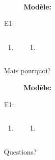 \documentclass{beamer}
\begin{document}
  \begin{frame}{}
     \\
    \tinygloss{}
    \begin{description}
      \item[] \textbf{Modèle:} \emph{}
      \item[E1:]
    \end{description}
    \begin{columns}
        \begin{enumerate}
          \item
        \end{enumerate}
        \begin{enumerate}
          \setcounter{enumi}{}
          \item
        \end{enumerate}
    \end{columns}
  \end{frame}

  \begin{frame}{Mais pourquoi?}
     \\
    \tinygloss{}
    \begin{description}
      \item[] \textbf{Modèle:} \emph{}
      \item[E1:]
    \end{description}
    \begin{columns}[t]
        \begin{enumerate}
          \item
        \end{enumerate}
        \begin{enumerate}
          \setcounter{enumi}{}
          \item
        \end{enumerate}
    \end{columns}
  \end{frame}

  \begin{frame}{}
    \begin{center}
      \Large Questions?
    \end{center}
  \end{frame}
\end{document}
